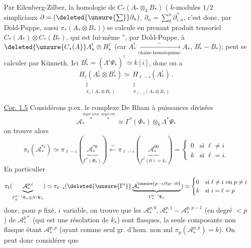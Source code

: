 Par Eilenberg-Zilber, la homologie de
$C_*(A_*\otimes_k B_*)$ (
$k$-modules $1/2$ simpliciaux \deleted{$\unsure{\Phi_*\longrightarrow}$}
$\partial=(\deleted{\unsure{\sum}}\partial_n)$,
$\partial_n=\sum_0^n\partial^*_{i,n}$,
c'est donc, par Dold-Puppe, aussi $\pi_*(A_*\otimes B_*)$)
se calcule en prenant  produit tensoriel
 $C_*(A_*)\otimes C_*(B_*)$, qui est lui-même
'', par Dold-Puppe, à
$\deleted{\unsure{C_*(A}}A_*^!\otimes B_*^!$
(car $A_*^!\xrightarrow[\text{chaine-homotopisme}]{\sim}A_*$,
$B_*^!\mathbin{-}B_*$);
 peut se calculer par Künneth.
Ici $B_*^!=(\Lambda^i\Psi_*)^!\simeq k[i]$, donc on  a
\[
\underset{\substack{\Vert\\\pi_\ell(A_*\otimes B_*)}}{H_\ell(A_*^!\otimes B_*^!)}
\simeq
\underset{\substack{\Vert\\\pi_{\ell-i}(A_*\otimes B_*)}}{H_{\ell-i}(A_*^!)}.
\]

\uline{Cor. 1.5}
Considérons p.ex. le complexe 
De Rham à puissances divisées
\[
\mathcal A_*^{\overset{\text{degré total}}{*}\,\overset{\text{degré ext}}{*}}
\simeq\Gamma^*(\Phi_*)\otimes_k\Lambda^*\Psi_*
\]
on trouve alors
\[
\pi_\ell(\mathcal A_*^{*i})\simeq
\pi_{\ell-i}(\underbrace{\mathcal A_*^{*0}}_{\Gamma^*(\Phi_*)})
\xleftarrow{\sim}\pi_{\ell-i}(\underbrace{\mathcal A_*^{00}}_{\Gamma^*(0)=k_*})
=\begin{cases}0&\text{si }\ell\ne i\\k&\text{si }\ell=i.\end{cases}
\]
En  particulier
\[
\pi_\ell(\underbrace{\mathcal A_*^{p,i}}_{\Gamma_k^{p-i}\Phi_*\otimes\Lambda^i\Psi_*})
\simeq\pi_{\ell-i}(\deleted{\unsure{\Gamma^i}}
\underbrace{\mathcal A_*^{\unsure{p-i,0|p-i0}}}_{\Gamma_*^{p-i}\Phi_*})
\simeq\begin{cases}0&\text{si }\ell\ne i\text{ ou }p\ne i\\k&\text{si }i=\ell=p\end{cases}
\]
donc, pour $p$ fixé, $i$ variable, on trouve que les 
$\mathcal A_*^{p,0},\mathcal A_*^{p,1}\mathbin{-}\mathcal A_*^{p,p-1}$
 (en degré $<p$) de $\mathcal A_*^{p*}$ 
(qui est une résolution de $k_*$) sont flasques, la seule composante non flasque étant
$\mathcal A_*^{p,p}$ (ayant comme seul gr. d'hom. non nul
$\pi_p(\mathcal A_*^{p,p})=k$). On peut donc considérer que
